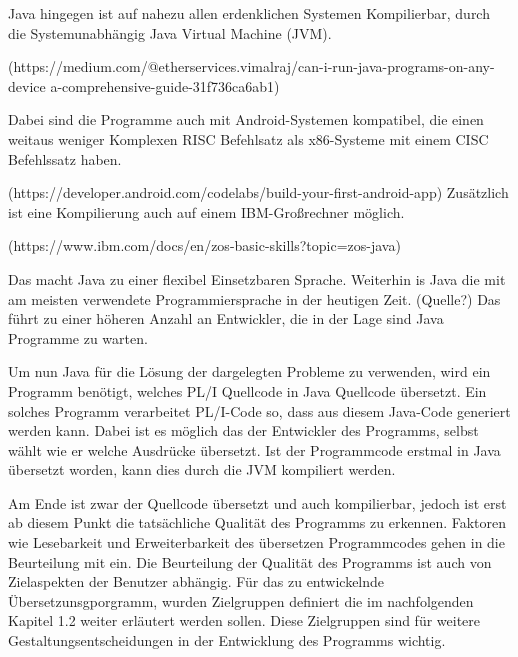 Java hingegen ist auf nahezu allen erdenklichen Systemen Kompilierbar, durch die Systemunabhängig Java Virtual Machine (JVM). 

(https://medium.com/@etherservices.vimalraj/can-i-run-java-programs-on-any-device
a-comprehensive-guide-31f736ca6ab1) 

Dabei sind die Programme auch mit Android-Systemen kompatibel, die einen weitaus weniger Komplexen RISC Befehlsatz als x86-Systeme mit einem CISC Befehlssatz haben.

(https://developer.android.com/codelabs/build-your-first-android-app) 
Zusätzlich ist eine Kompilierung auch auf einem IBM-Großrechner möglich. 

(https://www.ibm.com/docs/en/zos-basic-skills?topic=zos-java)

Das macht Java zu einer flexibel Einsetzbaren Sprache. Weiterhin is Java die mit am meisten verwendete Programmiersprache in der heutigen Zeit. (Quelle?) Das führt zu einer höheren Anzahl an Entwickler, die in der Lage sind Java Programme zu warten.

Um nun Java für die Lösung der dargelegten Probleme zu verwenden, wird ein Programm benötigt, welches PL/I Quellcode in Java Quellcode übersetzt. Ein solches Programm verarbeitet PL/I-Code so, dass aus diesem Java-Code generiert werden kann. Dabei ist es möglich das der Entwickler des Programms, selbst wählt wie er welche Ausdrücke übersetzt. Ist der Programmcode erstmal in Java übersetzt worden, kann dies durch die JVM kompiliert werden.

Am Ende ist zwar der Quellcode übersetzt und auch kompilierbar, jedoch ist erst ab diesem Punkt die tatsächliche Qualität des Programms zu erkennen. Faktoren wie Lesebarkeit und Erweiterbarkeit des übersetzen Programmcodes gehen in die Beurteilung mit ein. 
Die Beurteilung der Qualität des Programms ist auch von Zielaspekten der Benutzer abhängig. Für das zu entwickelnde Übersetzunsgporgramm, wurden Zielgruppen definiert die im nachfolgenden Kapitel 1.2 weiter erläutert werden sollen. Diese Zielgruppen sind für weitere Gestaltungsentscheidungen in der Entwicklung des Programms wichtig.

\pagebreak
     
     
